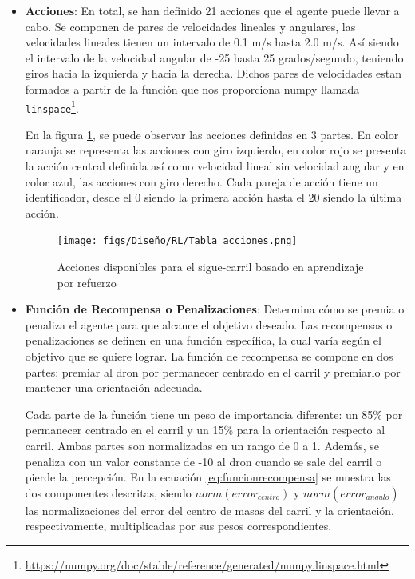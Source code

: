 \begin{itemize}
    \item \textbf{Acciones}: En total, se han definido 21 acciones que el agente puede llevar a cabo. Se componen de pares de velocidades lineales y angulares, las velocidades lineales
    tienen un intervalo de 0.1 m/s hasta 2.0 m/s. Así siendo el intervalo de la velocidad angular de -25 hasta 25 grados/segundo, teniendo giros hacia la izquierda y hacia la derecha. Dichos pares
    de velocidades estan formados a partir de la función que nos proporciona numpy llamada \texttt{linspace}\footnote{\url{https://numpy.org/doc/stable/reference/generated/numpy.linspace.html}}. \newline

    En la figura \ref{fig:Acciones}, se puede observar las acciones definidas en 3 partes. En color naranja se representa las acciones con giro izquierdo, en color rojo se presenta 
    la acción central definida así como velocidad lineal sin velocidad angular y en color azul, las acciones con giro derecho. Cada pareja de acción tiene un identificador, desde el 0
    siendo la primera acción hasta el 20 siendo la última acción. \newline
  
    \begin{figure} [H]
      \begin{center}
        \texttt{[image: figs/Diseño/RL/Tabla\_acciones.png]}
      \end{center}
      \caption{Acciones disponibles para el sigue-carril basado en aprendizaje por refuerzo}
      \label{fig:Acciones}
    \end{figure}
  
    \item \textbf{Función de Recompensa o Penalizaciones}: Determina cómo se premia o penaliza el agente para que alcance el objetivo deseado. Las recompensas o penalizaciones
    se definen en una función específica, la cual varía según el objetivo que se quiere lograr. La función de recompensa se compone en dos partes: premiar al dron por permanecer 
    centrado en el carril y premiarlo por mantener una orientación adecuada. 

    Cada parte de la función tiene un peso de importancia diferente: un 85\% por permanecer centrado en el carril y un 15\% para la orientación respecto al carril. Ambas partes 
    son normalizadas en un rango de 0 a 1. Además, se penaliza con un valor constante de -10 al dron cuando se sale del carril o pierde la percepción. En la ecuación 
    \ref{eq:funcionrecompensa} se muestra las dos componentes descritas, siendo $norm(error_{centro})$ y $norm(error_{angulo})$ las normalizaciones del error del centro de 
    masas del carril y la orientación, respectivamente, multiplicadas por sus pesos correspondientes.


\end{itemize}
